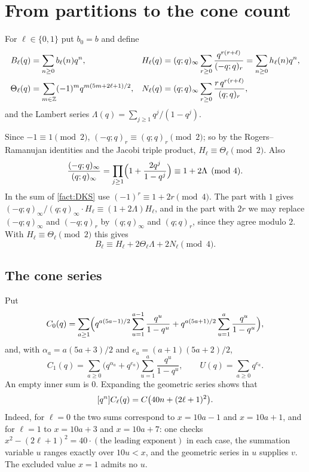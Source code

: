 \section{From partitions to the cone count}\label{sec:reduction}

For $\ell\in\{0,1\}$ put $b_0=b$ and define
\begin{align*}
  B_\ell(q)&=\sum_{n\ge0}b_\ell(n)q^n, &
  H_\ell(q)&=(q;q)_\infty\sum_{r\ge0}\frac{q^{r(r+\ell)}}{(-q;q)_r}=\sum_{n\ge0}h_\ell(n)q^n,\\
  \Theta_\ell(q)&=\sum_{m\in\mathbb{Z}}(-1)^mq^{m(5m+2\ell+1)/2}, &
  N_\ell(q)&=(q;q)_\infty\sum_{r\ge0}\frac{r\,q^{r(r+\ell)}}{(q;q)_r},
\end{align*}
and the Lambert series $\Lambda(q)=\sum_{j\ge1}q^j/(1-q^j)$.

Since $-1\equiv1\pmod2$, $(-q;q)_r\equiv(q;q)_r\pmod2$; so by the Rogers--Ramanujan
identities and the Jacobi triple product, $H_\ell\equiv\Theta_\ell\pmod2$. Also
\[
  \frac{(-q;q)_\infty}{(q;q)_\infty}=\prod_{j\ge1}\Bigl(1+\frac{2q^j}{1-q^j}\Bigr)
  \equiv1+2\Lambda\pmod4 .
\]
In the sum of \cref{fact:DKS} use $(-1)^r\equiv1+2r\pmod4$. The part with
$1$ gives $(-q;q)_\infty/(q;q)_\infty\cdot H_\ell\equiv(1+2\Lambda)H_\ell$, and in the
part with $2r$ we may replace $(-q;q)_\infty$ and $(-q;q)_r$ by $(q;q)_\infty$ and
$(q;q)_r$, since they agree modulo $2$. With $H_\ell\equiv\Theta_\ell\pmod2$ this gives
\begin{equation}\label{eq:B-mod4}
  B_\ell\equiv H_\ell+2\Theta_\ell\Lambda+2N_\ell\pmod4 .
\end{equation}

\subsection{The cone series}
Put
\[
  C_0(q)=\sum_{a\ge1}\Bigl(q^{a(5a-1)/2}\sum_{u=1}^{a-1}\frac{q^u}{1-q^u}
  +q^{a(5a+1)/2}\sum_{u=1}^{a}\frac{q^u}{1-q^u}\Bigr),
\]
and, with $\alpha_a=a(5a+3)/2$ and $e_a=(a+1)(5a+2)/2$,
\[
  C_1(q)=\sum_{a\ge0}\bigl(q^{\alpha_a}+q^{e_a}\bigr)\sum_{u=1}^{a}\frac{q^u}{1-q^u},\qquad
  U(q)=\sum_{a\ge0}q^{e_a}.
\]
An empty inner sum is $0$. Expanding the geometric series shows that
\begin{equation}\label{eq:cone-series}
  [q^{n}]C_\ell(q)=C\bigl(40n+(2\ell+1)^2\bigr).
\end{equation}
Indeed, for $\ell=0$ the two sums correspond to $x=10a-1$ and $x=10a+1$, and for
$\ell=1$ to $x=10a+3$ and $x=10a+7$: one checks
$x^2-(2\ell+1)^2=40\cdot(\text{the leading exponent})$ in each case, the summation
variable $u$ ranges exactly over $10u<x$, and the geometric series in $u$
supplies $v$. The excluded value $x=1$ admits no $u$.

